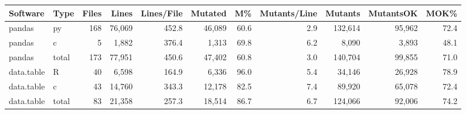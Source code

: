 \begin{tabular}{llrrrrrrrrr}
  \hline
Software & Type & Files & Lines & Lines/File & Mutated & M\% & Mutants/Line & Mutants & MutantsOK & MOK\% \\ 
  \hline
pandas & py & 168 & 76,069 & 452.8 & 46,089 & 60.6 & 2.9 & 132,614 & 95,962 & 72.4 \\ 
  pandas & c &  5 & 1,882 & 376.4 & 1,313 & 69.8 & 6.2 & 8,090 & 3,893 & 48.1 \\ 
  pandas & total & 173 & 77,951 & 450.6 & 47,402 & 60.8 & 3.0 & 140,704 & 99,855 & 71.0 \\ 
  data.table & R & 40 & 6,598 & 164.9 & 6,336 & 96.0 & 5.4 & 34,146 & 26,928 & 78.9 \\ 
  data.table & c & 43 & 14,760 & 343.3 & 12,178 & 82.5 & 7.4 & 89,920 & 65,078 & 72.4 \\ 
  data.table & total & 83 & 21,358 & 257.3 & 18,514 & 86.7 & 6.7 & 124,066 & 92,006 & 74.2 \\ 
   \hline
\end{tabular}
